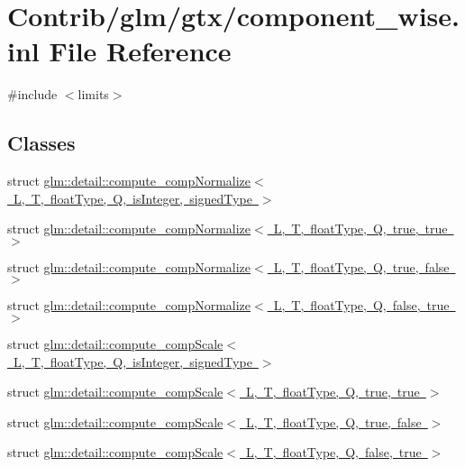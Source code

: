 \hypertarget{component__wise_8inl}{}\section{Contrib/glm/gtx/component\+\_\+wise.inl File Reference}
\label{component__wise_8inl}
{\ttfamily \#include $<$limits$>$}\newline
\subsection*{Classes}
\begin{DoxyCompactItemize}
\item 
struct \mbox{\hyperlink{structglm_1_1detail_1_1compute__comp_normalize}{glm\+::detail\+::compute\+\_\+comp\+Normalize$<$ L, T, float\+Type, Q, is\+Integer, signed\+Type $>$}}
\item 
struct \mbox{\hyperlink{structglm_1_1detail_1_1compute__comp_normalize_3_01_l_00_01_t_00_01float_type_00_01_q_00_01true_00_01true_01_4}{glm\+::detail\+::compute\+\_\+comp\+Normalize$<$ L, T, float\+Type, Q, true, true $>$}}
\item 
struct \mbox{\hyperlink{structglm_1_1detail_1_1compute__comp_normalize_3_01_l_00_01_t_00_01float_type_00_01_q_00_01true_00_01false_01_4}{glm\+::detail\+::compute\+\_\+comp\+Normalize$<$ L, T, float\+Type, Q, true, false $>$}}
\item 
struct \mbox{\hyperlink{structglm_1_1detail_1_1compute__comp_normalize_3_01_l_00_01_t_00_01float_type_00_01_q_00_01false_00_01true_01_4}{glm\+::detail\+::compute\+\_\+comp\+Normalize$<$ L, T, float\+Type, Q, false, true $>$}}
\item 
struct \mbox{\hyperlink{structglm_1_1detail_1_1compute__comp_scale}{glm\+::detail\+::compute\+\_\+comp\+Scale$<$ L, T, float\+Type, Q, is\+Integer, signed\+Type $>$}}
\item 
struct \mbox{\hyperlink{structglm_1_1detail_1_1compute__comp_scale_3_01_l_00_01_t_00_01float_type_00_01_q_00_01true_00_01true_01_4}{glm\+::detail\+::compute\+\_\+comp\+Scale$<$ L, T, float\+Type, Q, true, true $>$}}
\item 
struct \mbox{\hyperlink{structglm_1_1detail_1_1compute__comp_scale_3_01_l_00_01_t_00_01float_type_00_01_q_00_01true_00_01false_01_4}{glm\+::detail\+::compute\+\_\+comp\+Scale$<$ L, T, float\+Type, Q, true, false $>$}}
\item 
struct \mbox{\hyperlink{structglm_1_1detail_1_1compute__comp_scale_3_01_l_00_01_t_00_01float_type_00_01_q_00_01false_00_01true_01_4}{glm\+::detail\+::compute\+\_\+comp\+Scale$<$ L, T, float\+Type, Q, false, true $>$}}
\end{DoxyCompactItemize}

